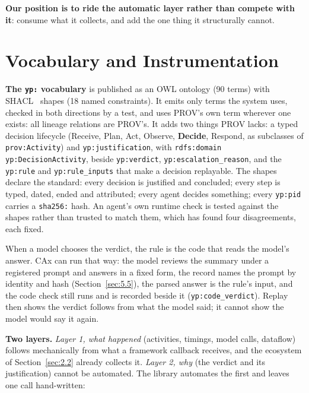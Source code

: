 \documentclass[conference]{IEEEtran}
\begin{document}
\noindent \textbf{Our position is to ride the automatic layer rather than compete with it}: consume what it collects, and add the one thing it structurally cannot.

\section{Vocabulary and Instrumentation}\label{sec:3}

\noindent \textbf{The \texttt{yp:\allowbreak{}} vocabulary} is published as an OWL ontology (90 terms) with SHACL~\cite{shacl} shapes (18 named constraints). It emits only terms the system uses, checked in both directions by a test, and uses PROV's own term wherever one exists: all lineage relations are PROV's. It adds two things PROV lacks: a typed decision lifecycle (Receive, Plan, Act, Observe, \textbf{Decide}, Respond, as subclasses of \texttt{prov:\allowbreak{}Activity}) and \texttt{yp:\allowbreak{}justification}, with \texttt{rdfs:\allowbreak{}domain yp:\allowbreak{}DecisionActivity}, beside \texttt{yp:\allowbreak{}verdict}, \texttt{yp:\allowbreak{}escalation\_\allowbreak{}reason}, and the \texttt{yp:\allowbreak{}rule} and \texttt{yp:\allowbreak{}rule\_\allowbreak{}inputs} that make a decision replayable. The shapes declare the standard: every decision is justified and concluded; every step is typed, dated, ended and attributed; every agent decides something; every \texttt{yp:\allowbreak{}pid} carries a \texttt{sha256:\allowbreak{}} hash. An agent's own runtime check is tested against the shapes rather than trusted to match them, which has found four disagreements, each fixed.

\noindent When a model chooses the verdict, the rule is the code that reads the model's answer. CAx can run that way: the model reviews the summary under a registered prompt and answers in a fixed form, the record names the prompt by identity and hash (Section~\ref{sec:5.5}), the parsed answer is the rule's input, and the code check still runs and is recorded beside it (\texttt{yp:\allowbreak{}code\_\allowbreak{}verdict}). Replay then shows the verdict follows from what the model said; it cannot show the model would say it again.

\noindent \textbf{Two layers.} \emph{Layer 1, what happened} (activities, timings, model calls, dataflow) follows mechanically from what a framework callback receives, and the ecosystem of Section~\ref{sec:2.2} already collects it. \emph{Layer 2, why} (the verdict and its justification) cannot be automated. The library automates the first and leaves one call hand-written:
\end{document}
